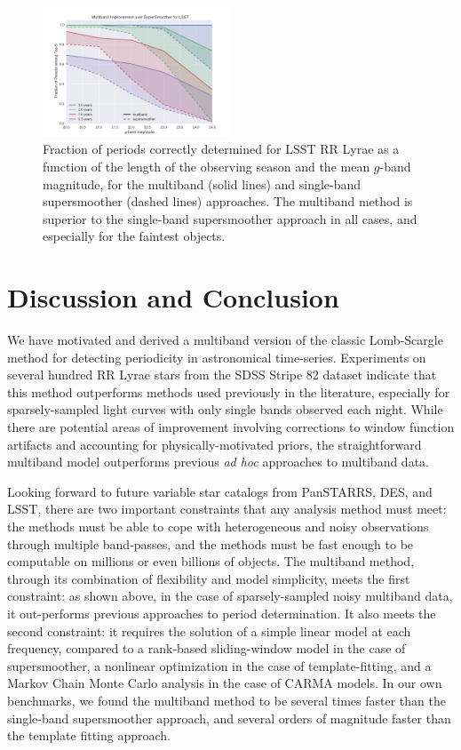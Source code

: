 \documentclass{emulateapj}
\newcommand{\foreign}[1]{{\it #1}}
\newcommand{\adhoc}{\foreign{ad hoc}}
\newcommand{\figlabel}[1]{\label{fig:#1}}
\newcommand{\sectlabel}[1]{\label{sect:#1}}
\begin{document}
\begin{figure}
  \centering
  \includegraphics[width=0.5\textwidth]{fig09.pdf}
  \caption{
    Fraction of periods correctly determined for LSST RR Lyrae as a function
    of the length of the observing season and the mean $g$-band magnitude, for the multiband (solid lines)
    and single-band supersmoother (dashed lines) approaches.
    The multiband method is superior to the single-band supersmoother approach in all cases, and especially for the faintest objects.
  } 
  \figlabel{LSST_sims}
\end{figure}

\section{Discussion and Conclusion}
\sectlabel{discussion}

We have motivated and derived a multiband version of the classic Lomb-Scargle method for detecting periodicity in astronomical time-series.
Experiments on several hundred RR Lyrae stars from the SDSS Stripe 82 dataset indicate that this method outperforms methods used previously in the literature, especially for sparsely-sampled light curves with only single bands observed each night.
While there are potential areas of improvement involving corrections to window function artifacts and accounting for physically-motivated priors, the straightforward multiband model outperforms previous \adhoc{} approaches to multiband data.

Looking forward to future variable star catalogs from PanSTARRS, DES, and LSST, there are two important constraints that any analysis method must meet: the methods must be able to cope with heterogeneous and noisy observations through multiple band-passes, and the methods must be fast enough to be computable on millions or even billions of objects.
The multiband method, through its combination of flexibility and model simplicity, meets the first constraint: as shown above, in the case of sparsely-sampled noisy multiband data, it out-performs previous approaches to period determination.
It also meets the second constraint: it requires the solution of a simple linear model at each frequency, compared to a rank-based sliding-window model in the case of supersmoother, a nonlinear optimization in the case of template-fitting, and a Markov Chain Monte Carlo analysis in the case of CARMA models.
In our own benchmarks, we found the multiband method to be several times faster than the single-band supersmoother approach, and several orders of magnitude faster than the template fitting approach.
\end{document}
